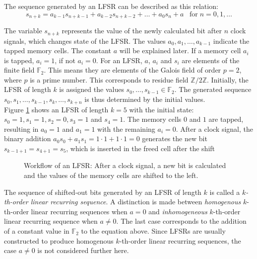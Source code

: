 \pagebreak

The sequence generated by an LFSR can be described as this relation:
\begin{equation*}
s_{n+k}=a_{k-1}s_{n+k-1}+a_{k-2}s_{n+k-2}+\ldots+a_0s_n+a \;\;\;\text{for}\; n = 0,1,\ldots
\end{equation*}

The variable $s_{n+k}$ represents the value of the newly calculated bit after $n$ clock signals, which changes state of the LFSR. The values $a_0,a_1,\ldots,a_{k-1}$ indicate the tapped memory cells. The constant $a$ will be explained later. If a memory cell $a_i$ is tapped, $a_i=1$, if not $a_i=0$. For an LFSR, $a$, $a_i$ and $s_i$ are elements of the finite field $\mathbb{F}_2$. This means they are elements of the Galois field of order $p=2$, where $p$ is a prime number. This corresponds to residue field $\mathbb{Z}/2\mathbb{Z}$. \cite[p. 48]{Lidl.1997} Initially, the LFSR of length $k$ is assigned the values $s_0,\ldots,s_{k-1}\in \mathbb{F}_2$. The generated sequence $s_0,s_1,\ldots,s_{k-1},s_k,\ldots,s_{k+n}$ is thus determined by the initial values. \cite[pp. 186-187]{Lidl.1986} \\

Figure \ref{fig:Figure_4} shows an LFSR of length $k=5$ with the initial state: $s_0=1, s_1=1, s_2=0, s_3=1$ and $s_4=1$. The memory cells $0$ and $1$ are tapped, resulting in $a_0=1$ and $a_1=1$ with the remaining $a_i=0$. After a clock signal, the binary addition $a_0s_0+a_1s_1=1\cdot1+1\cdot1=0$ generates the new bit $s_{k-1+1}=s_{4+1}=s_5$, which is inserted in the freed cell after the shift 

\begin{figure}[h]
	\centering
	
	\caption{Workflow of an LFSR: After a clock signal, a new bit is calculated and the values of the memory cells are shifted to the left.}
	\label{fig:Figure_4}
\end{figure}

The sequence of shifted-out bits generated by an LFSR of length $k$ is called a \textit{$k$-th-order linear recurring sequence}. A distinction is made between \textit{homogenous} $k$-th-order linear recurring sequences when $a=0$ and \textit{inhomogeneous} $k$-th-order linear recurring sequence when $a\neq0$. The last case corresponds to the addition of a constant value in $\mathbb{F}_2$ to the equation above. \cite[p. 186]{Lidl.1986} Since LFSRs are usually constructed to produce homogenous $k$-th-order linear recurring sequences, the case $a\neq0$ is not considered further here. \\

